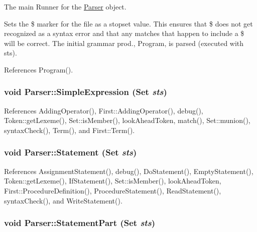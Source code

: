 The main Runner for the \hyperlink{classParser}{Parser} object.

Sets the \$ marker for the file as a stopset value. This ensures that \$ does not get recognized as a syntax error and that any matches that happen to include a \$ will be correct. The initial grammar prod., Program, is parsed (executed with sts). 

References Program().

\hypertarget{classParser_a6fc78d62a16df562e2a22e0f5c1acaf9}{
\subsubsection[{SimpleExpression}]{\setlength{\rightskip}{0pt plus 5cm}void Parser::SimpleExpression ({\bf Set} {\em sts})}}
\label{classParser_a6fc78d62a16df562e2a22e0f5c1acaf9}


References AddingOperator(), First::AddingOperator(), debug(), Token::getLexeme(), Set::isMember(), lookAheadToken, match(), Set::munion(), syntaxCheck(), Term(), and First::Term().

\hypertarget{classParser_a23d5c23531d92c7249034a9e637b4467}{
\subsubsection[{Statement}]{\setlength{\rightskip}{0pt plus 5cm}void Parser::Statement ({\bf Set} {\em sts})}}
\label{classParser_a23d5c23531d92c7249034a9e637b4467}


References AssignmentStatement(), debug(), DoStatement(), EmptyStatement(), Token::getLexeme(), IfStatement(), Set::isMember(), lookAheadToken, First::ProcedureDefinition(), ProcedureStatement(), ReadStatement(), syntaxCheck(), and WriteStatement().

\hypertarget{classParser_ac3ae7245f6ecc00a9e14cbed66a0b347}{
\subsubsection[{StatementPart}]{\setlength{\rightskip}{0pt plus 5cm}void Parser::StatementPart ({\bf Set} {\em sts})}}
\label{classParser_ac3ae7245f6ecc00a9e14cbed66a0b347}


